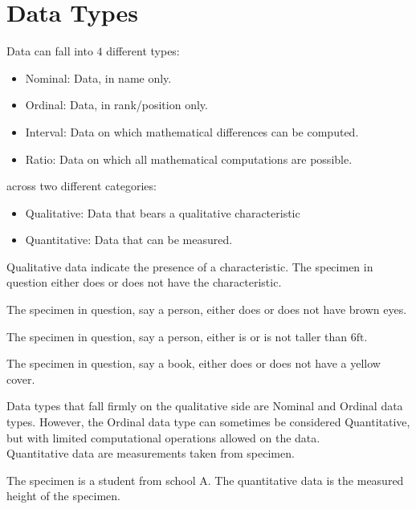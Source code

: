 \section{Data Types}

Data can fall into $4$ different types:
\begin{itemize}
    \item Nominal: Data, in name only.
    \item Ordinal: Data, in rank/position only.
    \item Interval: Data on which mathematical differences can be computed.
    \item Ratio: Data on which all mathematical computations are possible.
\end{itemize}
across two different categories:
\begin{itemize}
    \item Qualitative: Data that bears a qualitative characteristic
    \item Quantitative: Data that can be measured.
\end{itemize}

Qualitative data indicate the presence of a characteristic. The specimen in question either does or does not have the characteristic. 

\begin{example}
The specimen in question, say a person, either does or does not have brown eyes.
\end{example}

\begin{example}
The specimen in question, say a person, either is or is not taller than $6 \text{ft}$.
\end{example}

\begin{example}
The specimen in question, say a book, either does or does not have a yellow cover.
\end{example}

Data types that fall firmly on the qualitative side are Nominal and Ordinal data types. However, the Ordinal data type can sometimes be considered Quantitative, but with limited computational operations allowed on the data.\\

Quantitative data are measurements taken from specimen.

\begin{example}
The specimen is a student from school A. The quantitative data is the measured height of the specimen. 
\end{example}

